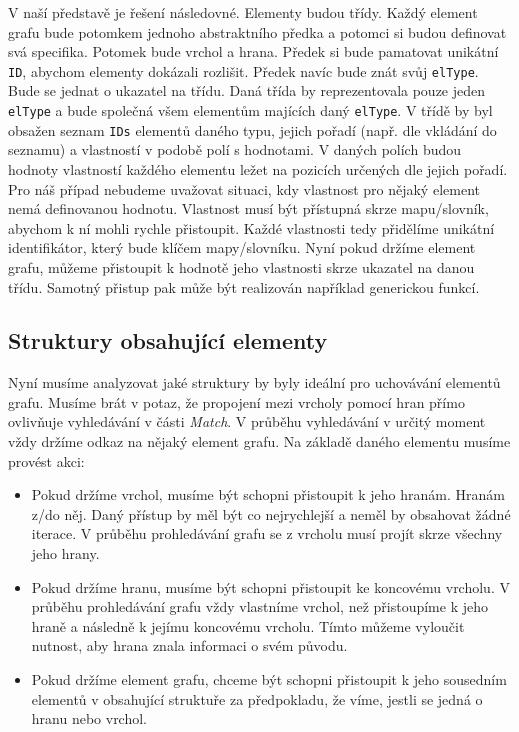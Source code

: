 V naší představě je řešení následovné.
Elementy budou třídy.
Každý element grafu bude potomkem jednoho abstraktního předka a potomci si budou definovat svá specifika.
Potomek bude vrchol a hrana.
Předek si bude pamatovat unikátní \verb+ID+, abychom elementy dokázali rozlišit. 
Předek navíc bude znát svůj \verb+elType+. 
Bude se jednat o ukazatel na třídu.
Daná třída by reprezentovala pouze jeden \verb+elType+ a bude společná všem elementům majících daný \verb+elType+.
V třídě by byl obsažen seznam \verb+IDs+ elementů daného typu, jejich pořadí (např. dle vkládání do seznamu) a vlastností v podobě polí s hodnotami.
V daných polích budou hodnoty vlastností každého elementu ležet na pozicích určených dle jejich pořadí.
Pro náš případ nebudeme uvažovat situaci, kdy vlastnost pro nějaký element nemá definovanou hodnotu.
Vlastnost musí být přístupná skrze mapu/slovník, abychom k ní mohli rychle přistoupit.
Každé vlastnosti tedy přidělíme unikátní identifikátor, který bude klíčem mapy/slovníku.
Nyní pokud držíme element grafu, můžeme přistoupit k hodnotě jeho vlastnosti skrze ukazatel na danou třídu.
Samotný přistup pak může být realizován například generickou funkcí. 

\subsection{Struktury obsahující elementy}

Nyní musíme analyzovat jaké struktury by byly ideální pro uchovávání elementů grafu.
Musíme brát v potaz, že propojení mezi vrcholy pomocí hran přímo ovlivňuje vyhledávání v části \textit{Match}.
V průběhu vyhledávání v určitý moment vždy držíme odkaz na nějaký element grafu.
Na základě daného elementu musíme provést akci:

\begin{itemize}

\item Pokud držíme vrchol, musíme být schopni přistoupit k jeho hranám.
Hranám z/do něj. Daný přístup by měl být co nejrychlejší a neměl by obsahovat žádné iterace. 
V průběhu prohledávání grafu se z vrcholu musí projít skrze všechny jeho hrany. 

\item Pokud držíme hranu, musíme být schopni přistoupit ke koncovému vrcholu. 
V průběhu prohledávání grafu vždy vlastníme vrchol, než přistoupíme k jeho hraně a následně k jejímu koncovému vrcholu. 
Tímto můžeme vyloučit nutnost, aby hrana znala informaci o svém původu.

\item Pokud držíme element grafu, chceme být schopni přistoupit k jeho sousedním elementů v obsahující struktuře za předpokladu, že víme, jestli se jedná o hranu nebo vrchol. 

\end{itemize}

